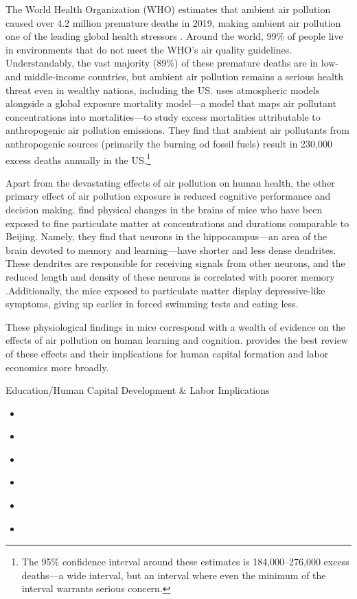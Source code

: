 The World Health Organization (WHO) estimates that ambient air pollution caused over 4.2 million premature deaths in 2019, making ambient air pollution one of the leading global health stressors \citep{who_factsheet}. Around the world, 99\% of people live in environments that do not meet the WHO's air quality guidelines. Understandably, the vast majority (89\%) of these premature deaths are in low- and middle-income countries, but ambient air pollution remains a serious health threat even in wealthy nations, including the US. \cite{lelieveld2019effects} uses atmospheric models alongside a global exposure mortality model---a model that maps air pollutant concentrations into mortalities---to study excess mortalities attributable to anthropogenic air pollution emissions. They find that ambient air pollutants from anthropogenic sources (primarily the burning od fossil fuels) result in 230,000 excess deaths annually in the US.\footnote{
    The 95\% confidence interval around these estimates is 184,000--276,000 excess deaths---a wide interval, but an interval where even the minimum of the interval warrants serious concern.
} 

Apart from the devastating effects of air pollution on human health, the other primary effect of air pollution exposure is reduced cognitive performance and decision making. \cite{fonken2011air} find physical changes in the brains of mice who have been exposed to fine particulate matter at concentrations and durations comparable to Beijing. Namely, they find that neurons in the hippocampus---an area of the brain devoted to memory and learning---have shorter and less dense dendrites. These dendrites are responsible for receiving signals from other neurons, and the reduced length and density of these neurons is correlated with poorer memory \citep{weir2012smog}.Additionally, the mice exposed to particulate matter display depressive-like symptoms, giving up earlier in forced swimming tests and eating less. 

These physiological findings in mice correspond with a wealth of evidence on the effects of air pollution on human learning and cognition. \cite{aguilar2022air} provides the best review of these effects and their implications for human capital formation and labor economics more broadly. 

\noindent Education/Human Capital Development \& Labor Implications
\begin{itemize}
    \item \cite{zhang2018impact}
    \item \cite{currie2014we}
    \item \cite{aguilar2022air}
    \item \cite{currie2009does}
    \item \cite{ebenstein2016long}
    \item \cite{chang2016particulate}
\end{itemize}




